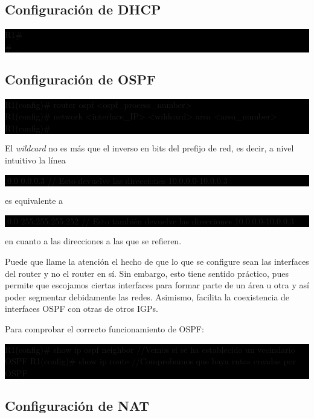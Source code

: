 \documentclass[10pt]{article}
\begin{document}
	\subsection{Configuración de DHCP}
		\noindent\colorbox{black}{%
    			\parbox{\dimexpr\linewidth-2\fboxsep}{%
        		\color{white}\ttfamily
        		R1\# \\
        		\# \_
    		}%
		}
	\subsection{Configuración de OSPF}
		\noindent\colorbox{black}{%
    			\parbox{\dimexpr\linewidth-2\fboxsep}{%
        		\color{white}\ttfamily
        		R1(config)\# router ospf <ospf\_process\_number> \\
        		R1(config)\# network <interface\_IP> <wildcard> area <area\_number> \\
        		R1(config)\#
    		}%
		} \par \vspace{0.25cm}
		\indent El \textit{wildcard} no es más que el inverso en bits del prefijo de red, es decir, a nivel intuitivo la línea \vspace{0.25cm}\newline
		\noindent\colorbox{black}{%
    			\parbox{\dimexpr\linewidth-2\fboxsep}{%
        		\color{white}.0.0 0.0.0.3	// Esto devuelve las direcciones 10.0.0.0-10.0.0.3
    		}%
		}\vspace{0.25cm} es equivalente a \vspace{0.25cm}\newline
		\noindent\colorbox{black}{%
    			\parbox{\dimexpr\linewidth-2\fboxsep}{%
        		\color{white}.0.0 255.255.255.252	// Esto también devuelve las direcciones 10.0.0.0-10.0.0.3
    		}%
		} \par \vspace{0.25cm} 
		\noindent en cuanto a las direcciones a las que se refieren. \newline
		
		Puede que llame la atención el hecho de que lo que se configure sean las interfaces del router y no el router en sí. Sin embargo, esto tiene sentido práctico, pues permite que escojamos ciertas interfaces para formar parte de un área u otra y así poder segmentar debidamente las redes. Asimismo, facilita la coexistencia de interfaces OSPF con otras de otros IGPs. \newline \par \vspace{0.25cm}
		Para comprobar el correcto funcionamiento de OSPF:  \newline \par \vspace{0.25cm}
		\noindent\colorbox{black}{%
    			\parbox{\dimexpr\linewidth-2\fboxsep}{%
        		\color{white}\ttfamily
        		R1(config)\# show ip ospf neighbor	//Vemos si se ha establecido un vecindario OSPF
        		R1(config)\# show ip route	//Comprobamos que haya rutas creadas por OSPF
    		}%
		}
	\subsection{Configuración de NAT}
\end{document}
